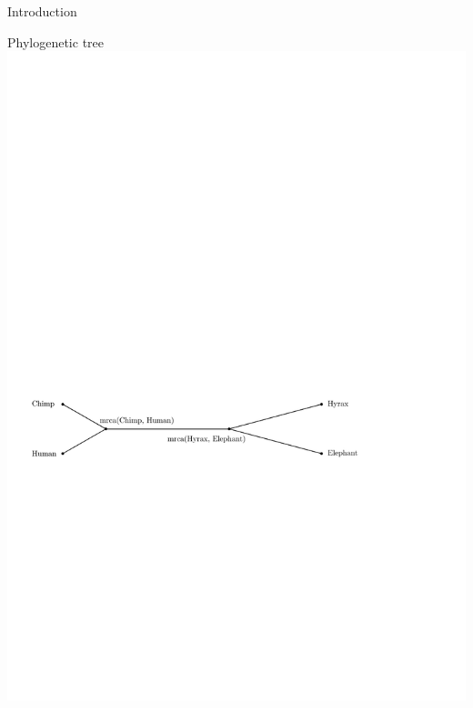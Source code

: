 \documentclass{beamer}
\theoremstyle{example}
\begin{document}
\begin{frame}{Introduction}
\begin{block}{Phylogenetic tree}
\includegraphics[width=\framewidth]{hyrax}
\end{block}
\end{frame}

\addtocounter{framenumber}{-1}
\end{document}
